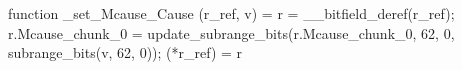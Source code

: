 function _set_Mcause_Cause (r_ref, v) = {
    r = __bitfield_deref(r_ref);
    r.Mcause_chunk_0 = update_subrange_bits(r.Mcause_chunk_0, 62, 0, subrange_bits(v, 62, 0));
    (*r_ref) = r
}
